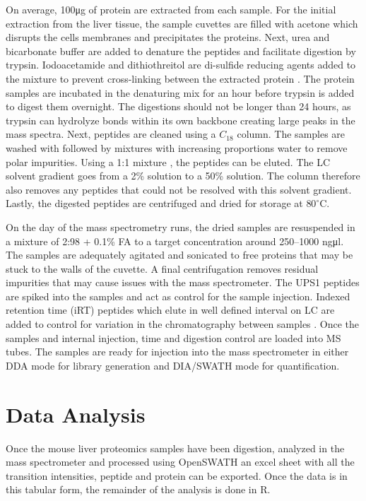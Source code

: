 \documentclass[a4paper]{book}
\begin{document}
	On average, 100\si{\micro\gram} of protein are extracted from each sample. For the initial extraction from the liver tissue, the sample cuvettes are filled with acetone which disrupts the cells membranes and precipitates the proteins. Next, urea and bicarbonate buffer are added to denature the peptides and facilitate digestion by trypsin. Iodoacetamide and dithiothreitol are di-sulfide reducing agents added to the mixture to prevent cross-linking between the extracted protein \citep{Voet2011Biochemistry}. The protein samples are incubated in the denaturing mix for an hour before trypsin is added to digest them overnight. The digestions should not be longer than 24 hours, as trypsin can hydrolyze bonds within its own backbone creating large peaks in the mass spectra. Next, peptides are cleaned using a $C_18$ column. The samples are washed with  followed by mixtures  with increasing proportions water to remove polar impurities. Using a 1:1 mixture , the peptides can be eluted. The LC solvent gradient goes from a 2\%  solution to a 50\% solution. The column therefore also removes any peptides that could not be resolved with this solvent gradient. Lastly, the digested peptides are centrifuged and dried for storage at $80^\circ$C. 
	
	On the day of the mass spectrometry runs, the dried samples are resuspended in a mixture of 2:98 + 0.1\% FA to a target concentration around 250–1000 ng\si{\micro\litre}. The samples are adequately agitated and sonicated to free proteins that may be stuck to the walls of the cuvette. A final centrifugation removes residual impurities that may cause issues with the mass spectrometer. The UPS1 peptides are spiked into the samples and act as control for the sample injection. Indexed retention time (iRT) peptides which elute in well defined interval on LC are added to control for variation in the chromatography between samples \citep{Escher2012UsingPeptides.}. Once the samples and internal injection, time and digestion control are loaded into MS tubes. The samples are ready for injection into the mass spectrometer in either DDA mode for library generation and DIA/SWATH mode for quantification.
	
	\section{Data Analysis}

	Once the mouse liver proteomics samples have been digestion, analyzed in the mass spectrometer and processed using OpenSWATH an excel sheet with all the transition intensities, peptide and protein can be exported. Once the data is in this tabular form, the remainder of the analysis is done in R.
	
\end{document}
